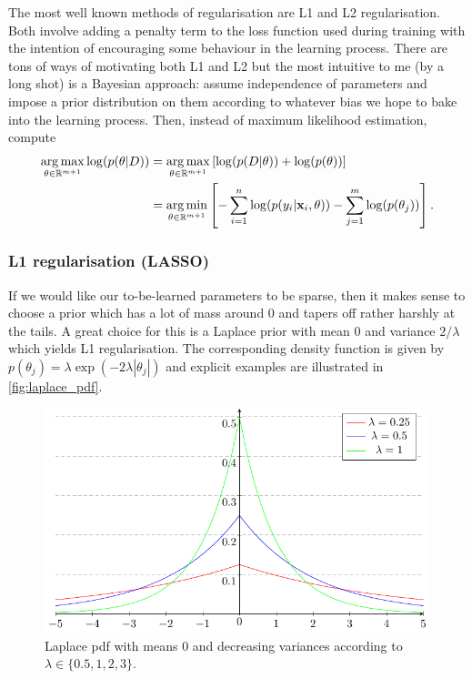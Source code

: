 \documentclass[11pt]{article}
\begin{document}
The most well known methods of regularisation are L1 and L2 regularisation. Both involve adding a penalty term to the loss function used during training with the intention of encouraging some behaviour in the learning process. There are tons of ways of motivating both L1 and L2 but the most intuitive to me (by a long shot) is a Bayesian approach: assume independence of parameters and impose a prior distribution on them according to whatever bias we hope to bake into the learning process. Then, instead of maximum likelihood estimation, compute
\begin{align*}
    \operatorname*{arg\,max}_{\theta\in\mathbb{R}^{m+1}}\log(p(\theta|D))
    &=
    \operatorname*{arg\,max}_{\theta\in\mathbb{R}^{m+1}}\left[\log(p(D|\theta))+\log(p(\theta))\right]\\
    &=
    \operatorname*{arg\,min}_{\theta\in\mathbb{R}^{m+1}}\left[-\sum_{i=1}^n\log(p(y_i|\mathbf{x}_i,\theta))-\sum_{j=1}^m\log(p(\theta_j))\right].
\end{align*}

\subsubsection{L1 regularisation (LASSO)}
If we would like our to-be-learned parameters to be sparse, then it makes sense to choose a prior which has a lot of mass around 0 and tapers off rather harshly at the tails. A great choice for this is a Laplace prior with mean 0 and variance $2/\lambda$ which yields L1 regularisation. The corresponding density function is given by $p(\theta_j)=\lambda\exp(-2\lambda|\theta_j|)$ and explicit examples are illustrated in \autoref{fig:laplace_pdf}.

\begin{figure}[t]
    \centering
    \includegraphics[width=\columnwidth]{./figures/supervised_learning/laplace_pdf.pdf}
    \caption{Laplace pdf with means 0 and decreasing variances according to $\lambda\in\{0.5,1,2,3\}$.}
    \label{fig:laplace_pdf}
\end{figure}
\end{document}
